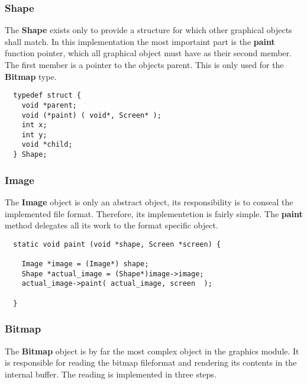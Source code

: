 \subsubsection{Shape}
The {\bf Shape} exists only to provide a structure for which other
graphical objects shall match. In this implementation the most
importaint part is the {\bf paint} function pointer, which all
graphical object must have as their second member. The first member is
a pointer to the objects parent. This is only used for the {\bf Bitmap}
type.
\\
\begin{lstlisting}
  typedef struct {
    void *parent;
    void (*paint) ( void*, Screen* );
    int x;
    int y;
    void *child;
  } Shape;
\end{lstlisting}

\subsubsection{Image}
The {\bf Image} object is only an abstract object, its responsibility
is to conseal the implemented file format. Therefore, its implementetion
is fairly simple. The {\bf paint} method delegates all its work to the
format specific object.
\\
\begin{lstlisting}
  static void paint (void *shape, Screen *screen) {

    Image *image = (Image*) shape;
    Shape *actual_image = (Shape*)image->image;
    actual_image->paint( actual_image, screen  );

  }
\end{lstlisting}

\subsubsection{Bitmap}
The {\bf Bitmap} object is by far the most complex object in the
graphics module. It is responsible for reading the bitmap fileformat
and rendering its contents in the internal buffer. The reading is
implemented in three steps.

